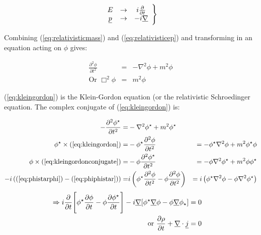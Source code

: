 \begin{equation}
  \begin{array}{ccc}
  E & \to & i\frac{\partial}{\partial t} \\
  \underline{p} & \to & -i\underline{\nabla}
  \end{array}
  \Bigg\}
  \label{eq:relativisticep}
\end{equation}

Combining (\ref{eq:relativisticmass}) and (\ref{eq:relativisticep}) and transforming in an equation acting on $\phi$ gives:

\begin{eqnarray}
  \frac{\partial^2\phi}{\partial t^2} & = & -\nabla^2\phi + m^2\phi
  \label{eq:kleingordon} \\
  \textrm{Or } \Box^2\phi & = & m^2 \phi \nonumber
\end{eqnarray}

(\ref{eq:kleingordon}) is the Klein-Gordon equation (or the relativistic Schroedinger equation.  The complex conjugate of (\ref{eq:kleingordon}) is:

\begin{eqnarray}
  -\frac{\partial^2\phi^{\star}}{\partial t^2} = & -\nabla^2\phi^{\star} + m^2\phi^{\star} &\label{eq:kleingordonconjugate} \\
  \phi^{\star}\times(\ref{eq:kleingordon}) = & -\phi^{\star}\frac{\partial^2\phi}{\partial t^2} & = -\phi^{\star}\nabla^2\phi + m^2\phi^{\star}\phi \label{eq:phistarphi} \\
  \phi\times(\ref{eq:kleingordonconjugate}) = & -\phi\frac{\partial^2 \phi^{\star}}{\partial t^2} & = -\phi\nabla^2\phi^{\star} + m^2\phi\phi^{\star} \label{eq:phiphistar} \\
  -i\left( (\ref{eq:phistarphi}) - (\ref{eq:phiphistar}) \right) = & i\left( \phi^{\star}\frac{\partial^2\phi}{\partial t^2}- \phi\frac{\partial^2\phi}{\partial t^2}\right) & = i\left(\phi^{\star}\nabla^2\phi - \phi\nabla^2\phi^{\star} \right) \nonumber
\end{eqnarray}
\begin{eqnarray}
  \Rightarrow i \frac{\partial}{\partial t}\Bigg[ \phi^{\star}\frac{\partial \phi}{\partial t} - \phi\frac{\partial \phi^{\star}}{\partial t}\Bigg] - i\underline{\nabla}\lbrack \phi^{\star}\underline{\nabla}\phi - \phi\underline{\nabla}\phi_{\star}\rbrack & = 0 & \nonumber \\
  \textrm{or } \frac{\partial \rho}{\partial t} + \underline{\nabla}\cdot\underline{j} & = 0 & \nonumber
\end{eqnarray}

